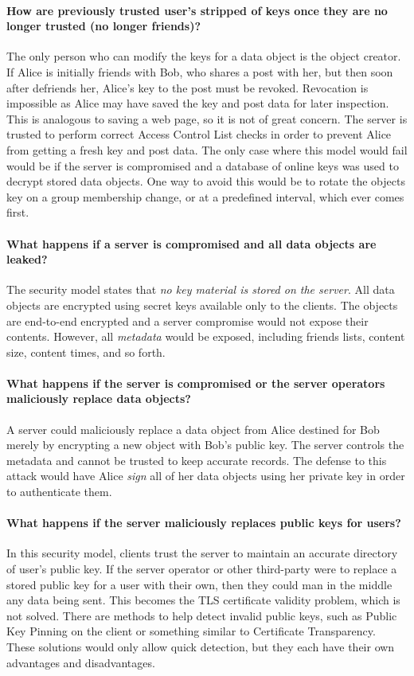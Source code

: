 \documentclass{article}
\begin{document}
  \paragraph*{How are previously trusted user's stripped of keys once they are no longer trusted (no longer friends)?} The only person who can modify the keys for a data object is the object creator. If Alice is initially friends with Bob, who shares a post with her, but then soon after defriends her, Alice's key to the post must be revoked. Revocation is impossible as Alice may have saved the key and post data for later inspection. This is analogous to saving a web page, so it is not of great concern. The server is trusted to perform correct Access Control List checks in order to prevent Alice from getting a fresh key and post data. The only case where this model would fail would be if the server is compromised and a database of online keys was used to decrypt stored data objects. One way to avoid this would be to rotate the objects key on a group membership change, or at a predefined interval, which ever comes first.
\paragraph*{What happens if a server is compromised and all data objects are leaked?} The security model states that \emph{no key material is stored on the server}. All data objects are encrypted using secret keys available only to the clients. The objects are end-to-end encrypted and a server compromise would not expose their contents. However, all \emph{metadata} would be exposed, including friends lists, content size, content times, and so forth.
\paragraph*{What happens if the server is compromised or the server operators maliciously replace data objects?} A server could maliciously replace a data object from Alice destined for Bob merely by encrypting a new object with Bob's public key. The server controls the metadata and cannot be trusted to keep accurate records. The defense to this attack would have Alice \emph{sign} all of her data objects using her private key in order to authenticate them.
\paragraph*{What happens if the server maliciously replaces public keys for users?} In this security model, clients trust the server to maintain an accurate directory of user's public key. If the server operator or other third-party were to replace a stored public key for a user with their own, then they could man in the middle any data being sent. This becomes the TLS certificate validity problem, which is not solved. There are methods to help detect invalid public keys, such as Public Key Pinning on the client or something similar to Certificate Transparency. These solutions would only allow quick detection, but they each have their own advantages and disadvantages.
 
\end{document}
